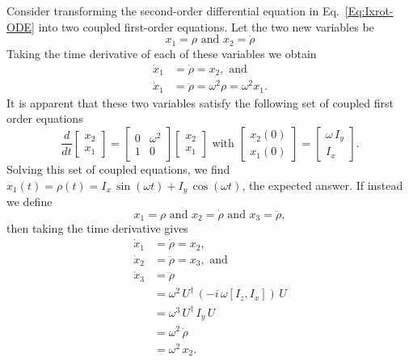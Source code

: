 \clearpage

Consider transforming the second-order differential equation in Eq.~\ref{Eq:Ixrot-ODE} into two coupled first-order equations.  Let the two new variables be 
\begin{equation}
x_1 = \rho \text{ and } x_2 = \dot{\rho}
\end{equation}
Taking the time derivative of each of these variables we obtain 
\begin{subequations}
\begin{align}
\dot{x}_1 & = \dot{\rho} = x_2, \text{ and} \\
\dot{x}_1 & = \ddot{\rho} = \omega^2 \rho = \omega^2 x_1.
\end{align}
\end{subequations}
It is apparent that these two variables satisfy the following set of coupled first order equations
\begin{equation}
\frac{d}{dt} \begin{bmatrix} x_2 \\ x_1 \end{bmatrix}
	= \begin{bmatrix} 0 & \omega^2 \\ 1 & 0 \end{bmatrix}
	  \begin{bmatrix} x_2 \\ x_1 \end{bmatrix}
\text{ with } 
\begin{bmatrix} x_2(0) \\ x_1(0) \end{bmatrix}
	=
	\begin{bmatrix} \omega \, I_{y} \\ I_{x} \end{bmatrix}. \label{Eq:Ixrot-2x2}
\end{equation}
Solving this set of coupled equations, we find $x_1(t) = \rho(t) = I_x \, \sin{(\omega t)} + I_y \, \cos{(\omega t)}$, the expected answer.  If instead we define
\begin{equation}
x_1 = \rho \text{ and } x_2 = \dot{\rho} \text{ and } x_3 = \ddot{\rho},
\end{equation}
then taking the time derivative gives
\begin{subequations}
\begin{align}
\dot{x}_1 & = \dot{\rho} = x_2, \\
\dot{x}_2 & = \ddot{\rho} = x_3, \text{ and} \\
\dot{x}_3 & = \dddot{\rho} \\
	& = \omega^2 \, U^{\dagger} \, (-i \, \omega [I_z,I_x] ) \, U \\
	& = \omega^3 \, U^{\dagger} \, I_{y} \, U \\
	& = \omega^2 \, \dot{\rho} \\
	& = \omega^2 \, x_2.
\end{align}
\end{subequations}
